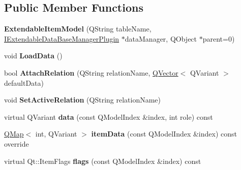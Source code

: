 \subsection*{Public Member Functions}
\begin{DoxyCompactItemize}
\item 
{\bfseries Extendable\+Item\+Model} (Q\+String table\+Name, \hyperlink{class_i_extendable_data_base_manager_plugin}{I\+Extendable\+Data\+Base\+Manager\+Plugin} $\ast$data\+Manager, Q\+Object $\ast$parent=0)\hypertarget{class_extendable_item_model_a896f75df752535510036e0c5d42fac8a}{}\label{class_extendable_item_model_a896f75df752535510036e0c5d42fac8a}

\item 
void {\bfseries Load\+Data} ()\hypertarget{class_extendable_item_model_ae5887f5d5086a094d712e2f7a1f6b84b}{}\label{class_extendable_item_model_ae5887f5d5086a094d712e2f7a1f6b84b}

\item 
bool {\bfseries Attach\+Relation} (Q\+String relation\+Name, \hyperlink{class_q_vector}{Q\+Vector}$<$ Q\+Variant $>$ default\+Data)\hypertarget{class_extendable_item_model_a49139d270880dc35b44b51bd95a36e89}{}\label{class_extendable_item_model_a49139d270880dc35b44b51bd95a36e89}

\item 
void {\bfseries Set\+Active\+Relation} (Q\+String relation\+Name)\hypertarget{class_extendable_item_model_ad5ce2033c7ba133259dc5c46a98e4694}{}\label{class_extendable_item_model_ad5ce2033c7ba133259dc5c46a98e4694}

\item 
virtual Q\+Variant {\bfseries data} (const Q\+Model\+Index \&index, int role) const \hypertarget{class_extendable_item_model_a61277cd164010ece244ba9658f7e10a1}{}\label{class_extendable_item_model_a61277cd164010ece244ba9658f7e10a1}

\item 
\hyperlink{class_q_map}{Q\+Map}$<$ int, Q\+Variant $>$ {\bfseries item\+Data} (const Q\+Model\+Index \&index) const override\hypertarget{class_extendable_item_model_ae75da3ede02d0f81e3a3523a99d9306f}{}\label{class_extendable_item_model_ae75da3ede02d0f81e3a3523a99d9306f}

\item 
virtual Qt\+::\+Item\+Flags {\bfseries flags} (const Q\+Model\+Index \&index) const \hypertarget{class_extendable_item_model_a8625ec204f0d6b9632f6eb099ec27290}{}\label{class_extendable_item_model_a8625ec204f0d6b9632f6eb099ec27290}


\end{DoxyCompactItemize}
